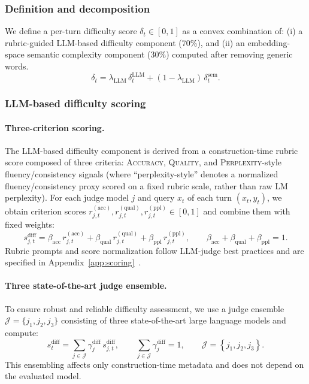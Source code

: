 \subsubsection{Definition and decomposition}
We define a per-turn difficulty score $\delta_t\in[0,1]$ as a convex combination of:
(i) a rubric-guided LLM-based difficulty component (70\%), and (ii) an embedding-space semantic complexity component (30\%) computed after removing generic words.
\begin{equation}
\label{eq:delta_decomp}
\delta_t = \lambda_{\mathrm{LLM}}\,\delta^{\mathrm{LLM}}_t + \left(1-\lambda_{\mathrm{LLM}}\right)\,\delta^{\mathrm{sem}}_t.
\end{equation}

\subsubsection{LLM-based difficulty scoring}
\label{app:difficulty_llm}

\paragraph{Three-criterion scoring.}
The LLM-based difficulty component is derived from a construction-time rubric score composed of three criteria: \textsc{Accuracy}, \textsc{Quality}, and \textsc{Perplexity}-style fluency/consistency signals (where ``perplexity-style'' denotes a normalized fluency/consistency proxy scored on a fixed rubric scale, rather than raw LM perplexity).
For each judge model $j$ and query $x_t$ of each turn $(x_t,y_t)$, we obtain criterion scores $r^{(\text{acc})}_{j,t}, r^{(\text{qual})}_{j,t}, r^{(\text{ppl})}_{j,t}\in[0,1]$ and combine them with fixed weights:
\begin{equation}
\label{eq:diff_llm_3crit}
s^{\mathrm{diff}}_{j,t} = \beta_{\mathrm{acc}}\, r^{(\mathrm{acc})}_{j,t} + \beta_{\mathrm{qual}}\, r^{(\mathrm{qual})}_{j,t} + \beta_{\mathrm{ppl}}\, r^{(\mathrm{ppl})}_{j,t}, \qquad
\beta_{\mathrm{acc}} + \beta_{\mathrm{qual}} + \beta_{\mathrm{ppl}} = 1.
\end{equation}
Rubric prompts and score normalization follow LLM-judge best practices and are specified in Appendix~\ref{app:scoring}~\citep{zheng-etal-2023-judging,chiang-etal-2024-chatbotarena,laskar-etal-2024-systematic}.

\paragraph{Three state-of-the-art judge ensemble.}
To ensure robust and reliable difficulty assessment, we use a judge ensemble $\mathcal{J}=\{j_1,j_2,j_3\}$ consisting of three state-of-the-art large language models and compute:
\begin{equation}
\label{eq:diff_llm_ensemble}
s^{\mathrm{diff}}_{t} = \sum_{j\in\mathcal{J}} \gamma^{\mathrm{diff}}_{j}\, s^{\mathrm{diff}}_{j,t}, \qquad
\sum_{j\in\mathcal{J}} \gamma^{\mathrm{diff}}_{j} = 1,
\qquad
\mathcal{J}=\left\{j_1,j_2,j_3\right\}.
\end{equation}
This ensembling affects only construction-time metadata and does not depend on the evaluated model.


